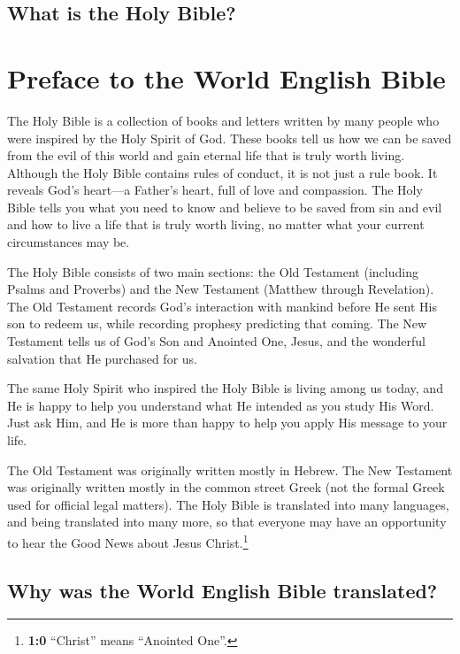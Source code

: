 \hypertarget{what-is-the-holy-bible}{%
\subsection{What is the Holy Bible?}\label{what-is-the-holy-bible}}

\hypertarget{preface-to-the-world-english-bible}{%
\section{Preface to the World English
Bible}\label{preface-to-the-world-english-bible}}

The Holy Bible is a collection of books and letters written by many
people who were inspired by the Holy Spirit of God. These books tell us
how we can be saved from the evil of this world and gain eternal life
that is truly worth living. Although the Holy Bible contains rules of
conduct, it is not just a rule book. It reveals God's heart---a Father's
heart, full of love and compassion. The Holy Bible tells you what you
need to know and believe to be saved from sin and evil and how to live a
life that is truly worth living, no matter what your current
circumstances may be.

The Holy Bible consists of two main sections: the Old Testament
(including Psalms and Proverbs) and the New Testament (Matthew through
Revelation). The Old Testament records God's interaction with mankind
before He sent His son to redeem us, while recording prophesy predicting
that coming. The New Testament tells us of God's Son and Anointed One,
Jesus, and the wonderful salvation that He purchased for us.

The same Holy Spirit who inspired the Holy Bible is living among us
today, and He is happy to help you understand what He intended as you
study His Word. Just ask Him, and He is more than happy to help you
apply His message to your life.

The Old Testament was originally written mostly in Hebrew. The New
Testament was originally written mostly in the common street Greek (not
the formal Greek used for official legal matters). The Holy Bible is
translated into many languages, and being translated into many more, so
that everyone may have an opportunity to hear the Good News about Jesus
Christ.\footnote{\textbf{1:0} ``Christ'' means ``Anointed One''.}

\hypertarget{why-was-the-world-english-bible-translated}{%
\subsection{Why was the World English Bible
translated?}\label{why-was-the-world-english-bible-translated}}

